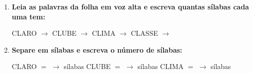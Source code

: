 \begin{exercicio}
\begin{enumerate}[resume]
  \item \textbf{Leia as palavras da folha em voz alta e escreva quantas sílabas cada uma tem:}

  \begin{center}
  CLARO $\rightarrow$ \underline{\hspace{1cm}} \quad CLUBE $\rightarrow$ \underline{\hspace{1cm}} \quad CLIMA $\rightarrow$ \underline{\hspace{1cm}} \quad CLASSE $\rightarrow$ \underline{\hspace{1cm}}
  \end{center}

  \item \textbf{Separe em sílabas e escreva o número de sílabas:}
  \begin{center}
  CLARO $=$ \underline{\hspace{1.2cm}} $\rightarrow$ \underline{\hspace{0.8cm}} sílabas \quad CLUBE $=$ \underline{\hspace{1.2cm}} $\rightarrow$ \underline{\hspace{0.8cm}} sílabas \quad CLIMA $=$ \underline{\hspace{1.2cm}} $\rightarrow$ \underline{\hspace{0.8cm}} sílabas
  \end{center}

\end{enumerate}

\end{exercicio}



